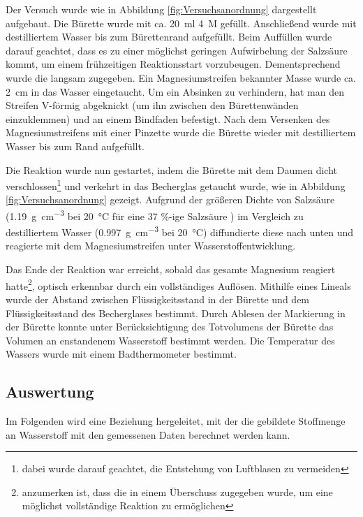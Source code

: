 \documentclass{article}
\begin{document}
    Der Versuch wurde wie in Abbildung \ref{fig:Versuchsanordnung} dargestellt aufgebaut. Die Bürette wurde mit ca. \SI[mode=text]{20}{\milli\litre} \SI[mode=text]{4}{M}  gefüllt. Anschließend wurde mit destilliertem Wasser bis zum Bürettenrand aufgefüllt. Beim Auffüllen wurde darauf geachtet, dass es zu einer möglichst geringen Aufwirbelung der Salzsäure kommt, um einem frühzeitigen Reaktionsstart vorzubeugen. Dementsprechend wurde die  langsam zugegeben. Ein  Magnesiumstreifen bekannter Masse wurde ca. \SI[mode=text]{2}{\centi\meter} in das Wasser eingetaucht. Um ein Absinken zu verhindern, hat man den Streifen V-förmig abgeknickt (um ihn zwischen den Bürettenwänden einzuklemmen) und an einem Bindfaden befestigt. Nach dem Versenken des Magnesiumstreifens mit einer Pinzette wurde die Bürette wieder mit destilliertem Wasser bis zum Rand aufgefüllt. 
    
    Die Reaktion wurde nun gestartet, indem die Bürette mit dem Daumen dicht verschlossen\footnote{dabei wurde darauf geachtet, die Entstehung von Luftblasen zu vermeiden} und verkehrt in das Becherglas getaucht wurde, wie in Abbildung \ref{fig:Versuchsanordnung} gezeigt. Aufgrund der größeren Dichte von Salzsäure (\SI[mode=text]{1.19}{\gram\per\cubic\centi\metre} bei \SI[mode=text]{20}{\degreeCelsius} für eine 37 \%-ige Salzsäure \cite{Salzs}) im Vergleich zu destilliertem Wasser (\SI[mode=text]{0.997}{\gram\per\cubic\centi\metre} bei \SI[mode=text]{20}{\degreeCelsius}) diffundierte diese nach unten und reagierte mit dem Magnesiumstreifen unter Wasserstoffentwicklung. 
    
    Das Ende der Reaktion war erreicht, sobald das gesamte Magnesium reagiert hatte\footnote{anzumerken ist, dass die  in einem Überschuss zugegeben wurde, um eine möglichst vollständige Reaktion zu ermöglichen}, optisch erkennbar durch ein vollständiges Auflösen. Mithilfe eines Lineals wurde der Abstand zwischen Flüssigkeitsstand in der Bürette und dem Flüssigkeitsstand des Becherglases bestimmt. Durch Ablesen der Markierung in der Bürette konnte unter Berücksichtigung des Totvolumens der Bürette das Volumen an enstandenem Wasserstoff bestimmt werden. Die Temperatur des Wassers wurde mit einem Badthermometer bestimmt.  
     
    \subsection{Auswertung}
    
      Im Folgenden wird eine Beziehung hergeleitet, mit der die gebildete Stoffmenge an Wasserstoff mit den gemessenen Daten berechnet werden kann. 
      
\end{document}
